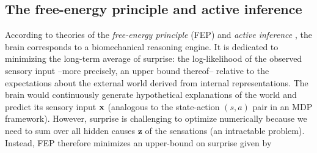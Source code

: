 \documentclass[10pt,letterpaper]{article}
\def\z{\mathbf{z}}
\def\x{\mathbf{x}}
\begin{document}
\subsection{The free-energy principle and active inference}
According to theories of the \textit{free-energy principle} (FEP) and
\textit{active inference} \citep{friston2010free, fristonAIorRL,dayan1995helmholtz},
the brain corresponds to
a biomechanical reasoning engine. It is
dedicated to minimizing the long-term average of surprise: the log-likelihood of the observed sensory input --more precisely, an upper bound thereof-- relative to the expectations about the external world derived from internal representations. The brain
would continuously generate hypothetical explanations of the world
and predict its sensory input $\bf{x}$ (analogous to the state-action $(s, a)$ pair in an MDP
framework).
However, surprise is challenging to optimize numerically
because we need to sum over all hidden causes $\z$ of the sensations (an intractable problem).
Instead, FEP therefore minimizes an upper-bound on surprise given by
\end{document}
